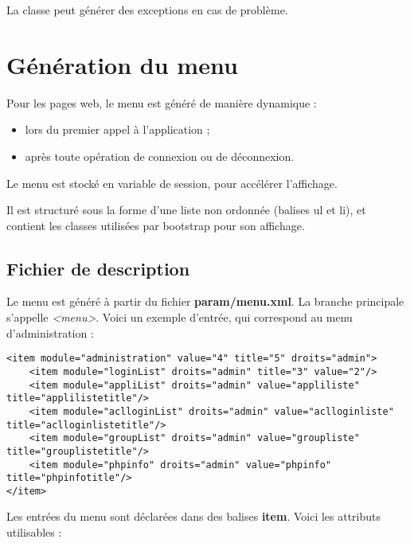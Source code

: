 La classe peut générer des exceptions en cas de problème.

\chapter{Génération du menu}
Pour les pages web, le menu est généré de manière dynamique :
\begin{itemize}
\item lors du premier appel à l'application ;
\item après toute opération de connexion ou de déconnexion.
\end{itemize}

Le menu est stocké en variable de session, pour accélérer l'affichage.

Il est structuré sous la forme d'une liste non ordonnée (balises ul et li), et contient les classes utilisées par bootstrap pour son affichage.

\section{Fichier de description}

Le menu est généré à partir du fichier \textbf{param/menu.xml}. La branche principale s'appelle \textit{<menu>}. Voici un exemple d'entrée, qui correspond au menu d'administration :

\begin{lstlisting}
<item module="administration" value="4" title="5" droits="admin">
	<item module="loginList" droits="admin" title="3" value="2"/>
	<item module="appliList" droits="admin" value="appliliste" title="applilistetitle"/>
	<item module="aclloginList" droits="admin" value="aclloginliste" title="aclloginlistetitle"/>
	<item module="groupList" droits="admin" value="groupliste" title="grouplistetitle"/>
	<item module="phpinfo" droits="admin" value="phpinfo" title="phpinfotitle"/>
</item>
\end{lstlisting}

Les entrées du menu sont déclarées dans des balises \textbf{item}. Voici les attributs utilisables :


